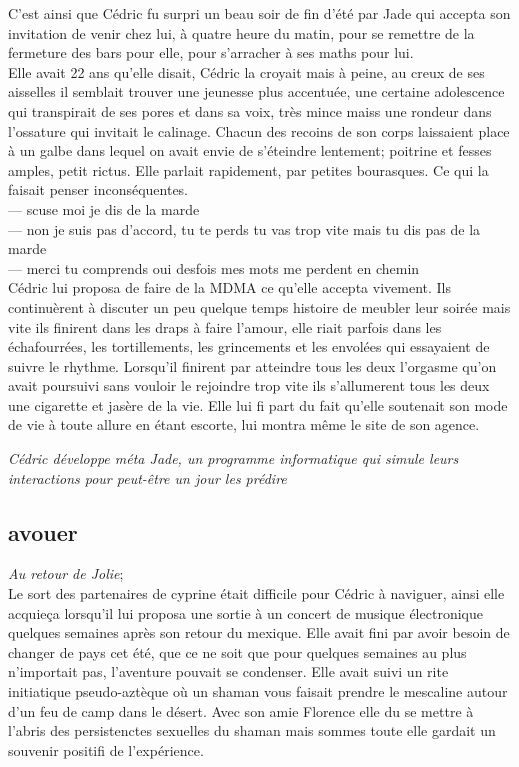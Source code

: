 \documentclass{article}
\begin{document}
C'est ainsi que Cédric fu surpri un beau soir de fin d'été par Jade qui accepta
son invitation de venir chez lui, à quatre heure du matin, pour se remettre de
la fermeture des bars pour elle, pour s'arracher à ses maths pour lui.\\

Elle avait 22 ans qu'elle disait, Cédric la croyait mais à peine, au creux de
ses aisselles il semblait trouver une jeunesse plus accentuée, une certaine
adolescence qui transpirait de ses pores et dans sa voix, très mince maiss une
rondeur dans l'ossature qui invitait le calinage. Chacun des recoins de son
corps laissaient place à un galbe dans lequel on avait envie de s'éteindre
lentement; poitrine et fesses amples, petit rictus. Elle parlait rapidement,
par petites bourasques. Ce qui la faisait penser inconséquentes.\\

--- scuse moi je dis de la marde \\
--- non je suis pas d'accord, tu te perds tu vas trop vite mais tu dis pas de la marde\\
--- merci tu comprends oui desfois mes mots me perdent en chemin\\

Cédric lui proposa de faire de la MDMA ce qu'elle accepta vivement. Ils
continuèrent à discuter un peu quelque temps histoire de meubler leur soirée
mais vite ils finirent dans les draps à faire l'amour, elle riait parfois dans
les échafourrées, les tortillements, les grincements et les envolées qui
essayaient de suivre le rhythme. Lorsqu'il finirent par atteindre tous les deux
l'orgasme qu'on avait poursuivi sans vouloir le rejoindre trop vite ils
s'allumerent tous les deux une cigarette et jasère de la vie. Elle lui fi part
du fait qu'elle soutenait son mode de vie à toute allure en étant escorte, lui
montra même le site de son agence.


\textit{Cédric développe méta Jade, un programme informatique qui simule leurs interactions
pour peut-être un jour les prédire}


\clearpage

\subsection{avouer}

\textit{Au retour de Jolie};\\

Le sort des partenaires de cyprine était difficile pour Cédric à naviguer, ainsi
elle acquieça lorsqu'il lui proposa une sortie à un concert de musique
électronique quelques semaines après son retour du mexique. Elle avait fini par
avoir besoin de changer de pays cet été, que ce ne soit que pour quelques
semaines au plus n'importait pas, l'aventure pouvait se condenser. Elle avait
suivi un rite initiatique pseudo-aztèque où un shaman vous faisait prendre le
mescaline autour d'un feu de camp dans le désert. Avec son amie Florence elle du
se mettre à l'abris des persistenctes sexuelles du shaman mais sommes toute elle
gardait un souvenir positifi de l'expérience.\\
\end{document}
